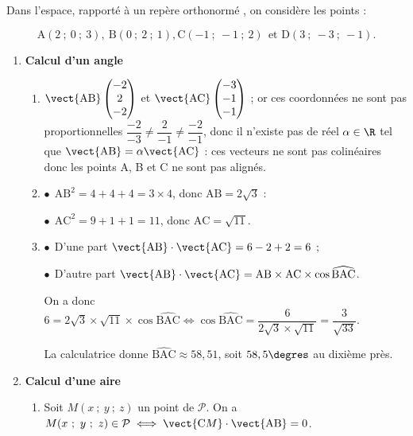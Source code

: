 \medskip

Dans l'espace, rapporté à un repère orthonormé \Oijk, on considère les points : 

\[\text{A}(2~;~0~;~3),\: \text{B}(0~;~2~;~1), \text{C}(-1~;~-1~;~2)\:\: \text{et D}(3~;~-3~;~ -1).\]
\smallskip

\begin{enumerate}
\item \textbf{Calcul d'un angle}
	\begin{enumerate}
		\item 
$\vect{\text{AB}}\begin{pmatrix}-2\\2\\-2\end{pmatrix}$ et $\vect{\text{AC}}\begin{pmatrix}-3\\-1\\-1\end{pmatrix}$ ; or ces coordonnées ne sont pas proportionnelles $\dfrac{-2}{-3} \ne \dfrac{2}{-1} \ne \dfrac{-2}{-1}$, donc il n'existe pas de réel $\alpha \in \R$ tel que $\vect{\text{AB}} = \alpha\vect{\text{AC}}$ : ces vecteurs ne sont pas colinéaires donc les points A, B et C ne sont pas alignés.
		\item 
$\bullet~~$$\text{AB}^2 = 4 + 4 + 4 = 3 \times 4$, donc $\text{AB} = 2\sqrt{3}$ :

$\bullet~~$$\text{AC}^2 = 9 + 1 + 1 = 11$, donc $\text{AC} = \sqrt{11}$.
		\item 

$\bullet~~$D'une part $\vect{\text{AB}}\cdot \vect{\text{AC}} = 6 - 2 + 2 = 6$ ;

$\bullet~~$D'autre part $\vect{\text{AB}}\cdot \vect{\text{AC}} = \text{AB} \times \text{AC} \times \cos \widehat{\text{BAC}}$.

On a donc $6 = 2\sqrt{3} \times \sqrt{11} \times \cos \widehat{\text{BAC}} \iff \cos \widehat{\text{BAC}} = \dfrac{6}{2\sqrt{3} \times \sqrt{11}} = \dfrac{3}{\sqrt{33}}$.

La calculatrice donne $\widehat{\text{BAC}} \approx 58,51$, soit $58,5\degres$ au dixième près.
	\end{enumerate}
\item \textbf{Calcul d'une aire}
	\begin{enumerate}
		\item 
		Soit $M(x~;~y~;~z)$ un point de $\mathcal{P}$. On a $M(x~;~y~;~z) \in\mathcal{P} \iff \vect{\text{C}M} \cdot \vect{\text{AB}} = 0$. 
		

\end{enumerate}
\end{enumerate}
